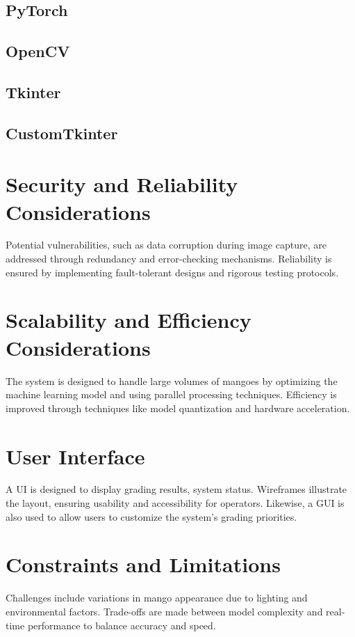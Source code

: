 \subsection{PyTorch}

\subsection{OpenCV}

\subsection{Tkinter}

\subsection{CustomTkinter}

\section{Security and Reliability Considerations}
Potential vulnerabilities, such as data corruption during image capture, are addressed through redundancy and error-checking mechanisms. Reliability is ensured by implementing fault-tolerant designs and rigorous testing protocols.

\section{Scalability and Efficiency Considerations}
The system is designed to handle large volumes of mangoes by optimizing the machine learning model and using parallel processing techniques. Efficiency is improved through techniques like model quantization and hardware acceleration.

\section{User Interface}
A \gls{UI} is designed to display grading results, system status. Wireframes illustrate the layout, ensuring usability and accessibility for operators. 
Likewise, a \gls{GUI} is also used to allow users to customize the system's grading priorities.

\section{Constraints and Limitations}
Challenges include variations in mango appearance due to lighting and environmental factors. Trade-offs are made between model complexity and real-time performance to balance accuracy and speed.

